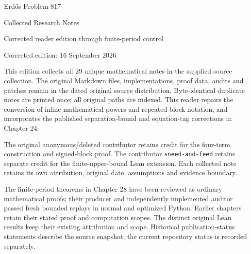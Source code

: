 \documentclass[10pt,a4paper,oneside]{book}
\begin{document}
\frontmatter
\begin{titlepage}\centering
\vspace*{25mm}
{\Huge Erd\H{o}s Problem 817\par}
\vspace{10mm}
{\LARGE Collected Research Notes\par}
\vspace{8mm}
{\Large Corrected reader edition through finite-period control\par}
\vfill
{\large Corrected edition: 16 September 2026\par}
\vspace{7mm}
\begin{minipage}{.88\textwidth}
This edition collects all 29 unique mathematical notes in the supplied source collection. The original Markdown files, implementations, proof data, audits and patches remain in the dated original source distribution. Byte-identical duplicate notes are printed once; all original paths are indexed. This reader repairs the conversion of inline mathematical powers and repeated-block notation, and incorporates the published separation-bound and equation-tag corrections in Chapter 24.

The original anonymous/deleted contributor retains credit for the four-term construction and signed-block proof. The contributor \texttt{sneed-and-feed} retains separate credit for the finite-upper-bound Lean extension. Each collected note retains its own attribution, original date, assumptions and evidence boundary.

The finite-period theorems in Chapter 28 have been reviewed as ordinary mathematical proofs; their producer and independently implemented auditor passed fresh bounded replays in normal and optimized Python. Earlier chapters retain their stated proof and computation scopes. The distinct original Lean results keep their existing attribution and scope. Historical publication-status statements describe the source snapshot; the current repository status is recorded separately.
\end{minipage}
\end{titlepage}
\tableofcontents
\mainmatter








\end{document}
